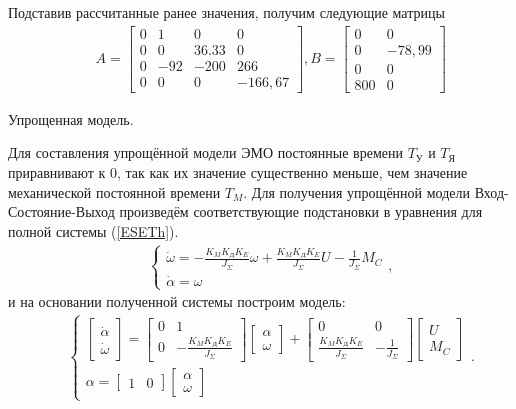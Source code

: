 \documentclass[12pt,a4paper]{article}
\begin{document}
Подставив рассчитанные ранее значения, получим следующие матрицы
\begin{align}
	&&A = 
	\begin{bmatrix}
		0 & 1 & 0 & 0\\
		0 & 0 & 36.33 & 0\\
		0 & -92 & -200 & 266\\
		0 & 0 & 0 & -166,67
	\end{bmatrix}, B =
	\begin{bmatrix}
		0 & 0\\
		0 & -78,99\\
		0 & 0\\
		800 & 0
	\end{bmatrix}
\end{align}

Упрощенная модель.\par
Для составления упрощённой модели ЭМО постоянные времени $T_\text{У}$ и $T_\text{Я}$ приравнивают к 0, так как их значение существенно меньше, чем значение механической постоянной времени $T_M$. Для получения упрощённой модели Вход-Состояние-Выход произведём соответствующие подстановки в уравнения для полной системы (\ref{ESETh}).
\begin{align}
	&&\begin{cases}
		\dot{\omega} = -\displaystyle{\frac{K_MK_\text{Д}K_E}{J_\Sigma}}\omega + \frac{K_MK_\text{Д}K_E}{J_\Sigma}U - \frac{1}{J_\Sigma}M_C\\
		\dot{\alpha} = \omega
	\end{cases},
\end{align}
и на основании полученной системы построим модель:
\begin{align}
	&&\begin{cases}
		\begin{bmatrix}
			\dot{\alpha}\\
			\dot{\omega}
		\end{bmatrix} =
		\begin{bmatrix}
			0 & 1\\
			0 & -\displaystyle{\frac{K_MK_\text{Д}K_E}{J_\Sigma}}
		\end{bmatrix}
		\begin{bmatrix}
			\alpha\\
			\omega
		\end{bmatrix} + 
		\begin{bmatrix}
			0 & 0\\
			\displaystyle{\frac{K_MK_\text{Д}K_E}{J_\Sigma}} & -\displaystyle{\frac{1}{J_\Sigma}}
		\end{bmatrix}
		\begin{bmatrix}
			U\\
			M_C
		\end{bmatrix}\\
		\alpha =
		\begin{bmatrix}
			1 & 0
		\end{bmatrix}
		\begin{bmatrix}
			\alpha\\
			\omega
		\end{bmatrix}
	\end{cases}.
\end{align}
	
\end{document}

